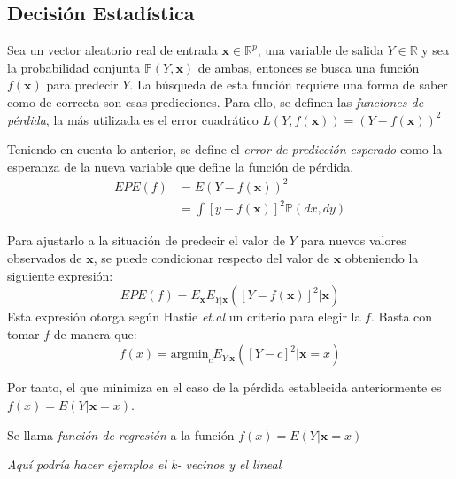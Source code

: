 \subsection{Decisión Estadística}
\noindent Sea un vector aleatorio real de entrada $\textbf{x}\in\mathbb{R}^p$, una variable de salida $Y\in\mathbb{R}$ y sea la probabilidad conjunta $\mathbb{P}(Y,\textbf{x})$ de ambas, entonces se busca una función $f(\textbf{x})$ para predecir $Y$. La búsqueda de esta función requiere una forma de saber como de correcta son esas predicciones. Para ello, se definen las \textit{funciones de pérdida}, la más utilizada es el error cuadrático $L(Y,f(\textbf{x}))=(Y-f(\textbf{x}))^2$
\begin{defi}
Teniendo en cuenta lo anterior, se define el \textit{error de predicción esperado} como la esperanza de la nueva variable que define la función de pérdida.
\begin{equation}
\begin{split}
EPE(f)& = E(Y-f(\textbf{x}))^2\\
&= \int [y-f(\textbf{x})]^2\mathbb{P}(dx,dy)
\end{split}
\end{equation}
\end{defi}

\noindent Para ajustarlo a la situación de predecir el valor de $Y$ para nuevos valores observados de $\textbf{x}$, se puede condicionar respecto del valor de $\textbf{x}$ obteniendo la siguiente expresión:
\begin{equation}
 EPE(f) = E_{\textbf{x}} E_{Y|\textbf{x}}([Y-f(\textbf{x})]^2|\textbf{x})
\end{equation} 
Esta expresión otorga según Hastie \textit{et.al} \cite{Hastie 2001} un criterio para elegir la $f$. Basta con tomar $f$ de manera que: 
\begin{equation}
 f(x)=\text{argmin}_c E_{Y|\textbf{x}}([Y-c]^2|\textbf{x}=x)
\end{equation}

\noindent Por tanto, el que minimiza en el caso de la pérdida establecida anteriormente es $f(x)=E(Y|\textbf{x}=x)$. 
\begin{defi}
\noindent Se llama \textit{función de regresión} a la función $f(x)=E(Y|\textbf{x}=x)$
\end{defi}

\emph{Aquí podría hacer ejemplos el k- vecinos y el lineal}

